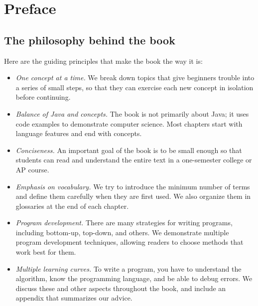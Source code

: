 \documentclass[12pt]{book}
\theoremstyle{exercise}
\begin{document}

\fi


\chapter*{Preface}
\label{preface}



\section*{The philosophy behind the book}

Here are the guiding principles that make the book the way it is:

\begin{itemize}

\item {\em One concept at a time.}
We break down topics that give beginners trouble into a series of small steps, so that they can exercise each new concept in isolation before continuing.

\item {\em Balance of Java and concepts.}
The book is not primarily about Java; it uses code examples to demonstrate computer science.
Most chapters start with language features and end with concepts.

\item {\em Conciseness.}
An important goal of the book is to be small enough so that students can read and understand the entire text in a one-semester college or AP course.

\item {\em Emphasis on vocabulary.}
We try to introduce the minimum number of terms and define them carefully when they are first used.
We also organize them in glossaries at the end of each chapter.

\item {\em Program development.}
There are many strategies for writing programs, including bottom-up, top-down, and others.
We demonstrate multiple program development techniques, allowing readers to choose methods that work best for them.

\item {\em Multiple learning curves.}
To write a program, you have to understand the algorithm, know the programming language, and be able to debug errors.
We discuss these and other aspects throughout the book, and include an appendix that summarizes our advice.

\end{itemize}
\end{document}
